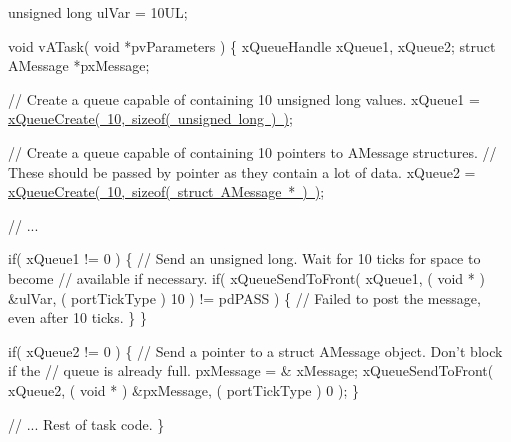 \begin{DoxyPre}unsigned long ulVar = 10UL;\end{DoxyPre}



\begin{DoxyPre}void vATask( void *pvParameters )
\{
xQueueHandle xQueue1, xQueue2;
struct AMessage *pxMessage;\end{DoxyPre}



\begin{DoxyPre}   // Create a queue capable of containing 10 unsigned long values.
   xQueue1 = \mbox{\hyperlink{queue_8h_aeb858b824bd74a934ea7ebb81af2a6bb}{xQueueCreate( 10, sizeof( unsigned long ) )}};\end{DoxyPre}



\begin{DoxyPre}   // Create a queue capable of containing 10 pointers to AMessage structures.
   // These should be passed by pointer as they contain a lot of data.
   xQueue2 = \mbox{\hyperlink{queue_8h_aeb858b824bd74a934ea7ebb81af2a6bb}{xQueueCreate( 10, sizeof( struct AMessage * ) )}};\end{DoxyPre}



\begin{DoxyPre}   // ...\end{DoxyPre}



\begin{DoxyPre}   if( xQueue1 != 0 )
   \{
    // Send an unsigned long.  Wait for 10 ticks for space to become
    // available if necessary.
    if( xQueueSendToFront( xQueue1, ( void * ) \&ulVar, ( portTickType ) 10 ) != pdPASS )
    \{
        // Failed to post the message, even after 10 ticks.
    \}
   \}\end{DoxyPre}



\begin{DoxyPre}   if( xQueue2 != 0 )
   \{
    // Send a pointer to a struct AMessage object.  Don't block if the
    // queue is already full.
    pxMessage = \& xMessage;
    xQueueSendToFront( xQueue2, ( void * ) \&pxMessage, ( portTickType ) 0 );
   \}\end{DoxyPre}



\begin{DoxyPre}   // ... Rest of task code.
\}
\end{DoxyPre}


